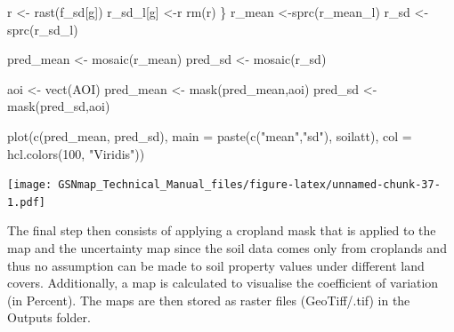 \documentclass[
  10pt,
  b5paper,
  oneside]{book}
\newenvironment{Shaded}{\begin{snugshade}}{\end{snugshade}}
\newcommand{\AttributeTok}[1]{\textcolor[rgb]{0.77,0.63,0.00}{#1}}
\newcommand{\DecValTok}[1]{\textcolor[rgb]{0.00,0.00,0.81}{#1}}
\newcommand{\FunctionTok}[1]{\textcolor[rgb]{0.00,0.00,0.00}{#1}}
\newcommand{\NormalTok}[1]{#1}
\newcommand{\OtherTok}[1]{\textcolor[rgb]{0.56,0.35,0.01}{#1}}
\newcommand{\StringTok}[1]{\textcolor[rgb]{0.31,0.60,0.02}{#1}}
\begin{document}
\begin{Shaded}
\begin{Highlighting}[]
\NormalTok{    r }\OtherTok{\textless{}{-}} \FunctionTok{rast}\NormalTok{(f\_sd[g])}
\NormalTok{    r\_sd\_l[g] }\OtherTok{\textless{}{-}}\NormalTok{r}
    \FunctionTok{rm}\NormalTok{(r)}
\NormalTok{  \}}
\NormalTok{  r\_mean }\OtherTok{\textless{}{-}}\FunctionTok{sprc}\NormalTok{(r\_mean\_l)}
\NormalTok{  r\_sd }\OtherTok{\textless{}{-}}\FunctionTok{sprc}\NormalTok{(r\_sd\_l)}
  
\NormalTok{  pred\_mean }\OtherTok{\textless{}{-}} \FunctionTok{mosaic}\NormalTok{(r\_mean)}
\NormalTok{  pred\_sd }\OtherTok{\textless{}{-}} \FunctionTok{mosaic}\NormalTok{(r\_sd)}
  
\NormalTok{  aoi }\OtherTok{\textless{}{-}} \FunctionTok{vect}\NormalTok{(AOI)}
\NormalTok{  pred\_mean }\OtherTok{\textless{}{-}} \FunctionTok{mask}\NormalTok{(pred\_mean,aoi)}
\NormalTok{  pred\_sd }\OtherTok{\textless{}{-}} \FunctionTok{mask}\NormalTok{(pred\_sd,aoi)}
  
  
  \FunctionTok{plot}\NormalTok{(}\FunctionTok{c}\NormalTok{(pred\_mean, pred\_sd), }\AttributeTok{main =} \FunctionTok{paste}\NormalTok{(}\FunctionTok{c}\NormalTok{(}\StringTok{"mean"}\NormalTok{,}\StringTok{"sd"}\NormalTok{), soilatt), }
       \AttributeTok{col =} \FunctionTok{hcl.colors}\NormalTok{(}\DecValTok{100}\NormalTok{, }\StringTok{"Viridis"}\NormalTok{))}
\end{Highlighting}
\end{Shaded}

\texttt{[image: GSNmap\_Technical\_Manual\_files/figure-latex/unnamed-chunk-37-1.pdf]}

The final step then consists of applying a cropland mask that is applied to the map and the uncertainty map since the soil data comes only from croplands and thus no assumption can be made to soil property values under different land covers. Additionally, a map is calculated to visualise the coefficient of variation (in Percent). The maps are then stored as raster files (GeoTiff/.tif) in the Outputs folder.
\end{document}
